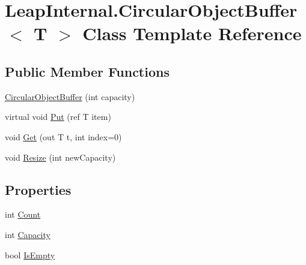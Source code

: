 \hypertarget{class_leap_internal_1_1_circular_object_buffer}{}\section{Leap\+Internal.\+Circular\+Object\+Buffer$<$ T $>$ Class Template Reference}
\label{class_leap_internal_1_1_circular_object_buffer}
\subsection*{Public Member Functions}
\begin{DoxyCompactItemize}
\item 
\mbox{\hyperlink{class_leap_internal_1_1_circular_object_buffer_ab47600a8fd18eaf2e7c4a93bd94a6939}{Circular\+Object\+Buffer}} (int capacity)
\item 
virtual void \mbox{\hyperlink{class_leap_internal_1_1_circular_object_buffer_a46ea828b5e827dd3b542eb60bc9f52df}{Put}} (ref T item)
\item 
void \mbox{\hyperlink{class_leap_internal_1_1_circular_object_buffer_ab16fbaf0f16bf53132679713e636a3c1}{Get}} (out T t, int index=0)
\item 
void \mbox{\hyperlink{class_leap_internal_1_1_circular_object_buffer_a96e1c0d42e5ae980a605f69ac4565322}{Resize}} (int new\+Capacity)
\end{DoxyCompactItemize}
\subsection*{Properties}
\begin{DoxyCompactItemize}
\item 
int \mbox{\hyperlink{class_leap_internal_1_1_circular_object_buffer_a06a299b4010edacd5c7f4187f9d0c9f5}{Count}}
\item 
int \mbox{\hyperlink{class_leap_internal_1_1_circular_object_buffer_ae41572e934feeb6effe84c31a24521ae}{Capacity}}
\item 
bool \mbox{\hyperlink{class_leap_internal_1_1_circular_object_buffer_a897abcef25602b14de45a6eb13ed626b}{Is\+Empty}}
\end{DoxyCompactItemize}


